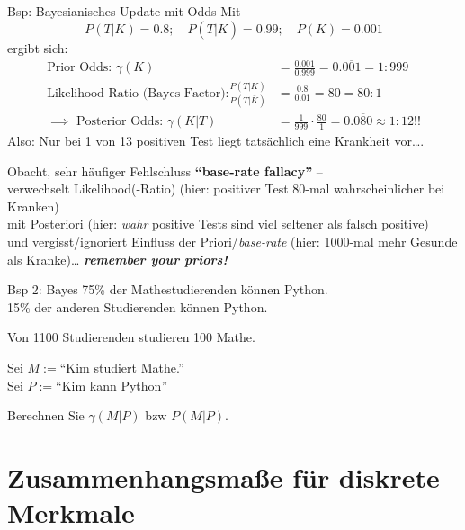 \documentclass[
  10pt,
  ignorenonframetext,
]{beamer}
\begin{document}
\begin{frame}{Bsp: Bayesianisches Update mit Odds}
\protect\hypertarget{bsp-bayesianisches-update-mit-odds}{}
Mit \[P(T|K) = 0.8; \quad P(\bar{T}|\bar{K}) = 0.99; \quad
P(K) = 0.001\] ergibt sich: \begin{align*}
\text{Prior Odds: } \gamma(K) &= \frac{0.001}{0.999} = 0.\overline{001} = 1:999 \\
\text{Likelihood Ratio (Bayes-Factor):} \frac{P(T|K)}{P(T|\bar K)} &= \frac{0.8}{0.01} = 80 = 80:1  \\
\implies\text{ Posterior Odds: } \gamma(K|T) &= \tfrac{1}{999} \cdot \tfrac{80}{1} = 0.\overline{080} \approx 1:12 !!
\end{align*} Also: Nur bei 1 von 13 positiven Test liegt tatsächlich
eine Krankheit vor\ldots.

Obacht, sehr häufiger Fehlschluss \textbf{``base-rate fallacy''} --\\
verwechselt Likelihood(-Ratio) (hier: positiver Test 80-mal
wahrscheinlicher bei Kranken)\\
mit Posteriori (hier: \emph{wahr} positive Tests sind viel seltener als
falsch positive)\\
und vergisst/ignoriert Einfluss der Priori/\emph{base-rate} (hier:
1000-mal mehr Gesunde als Kranke)\ldots{} \textbf{\emph{remember your
priors!}}

\end{frame}

\begin{frame}{Bsp 2: Bayes}
\protect\hypertarget{bsp-2-bayes}{}
75\% der Mathestudierenden können Python.\\
15\% der anderen Studierenden können Python.

Von 1100 Studierenden studieren 100 Mathe.

Sei \(M:=\)``Kim studiert Mathe.''\\
Sei \(P:=\)``Kim kann Python''

Berechnen Sie \(\gamma(M|P)\) bzw \(P(M|P)\).
\end{frame}

\hypertarget{zusammenhangsmauxdfe-fuxfcr-diskrete-merkmale}{%
\section{Zusammenhangsmaße für diskrete
Merkmale}\label{zusammenhangsmauxdfe-fuxfcr-diskrete-merkmale}}
\end{document}
